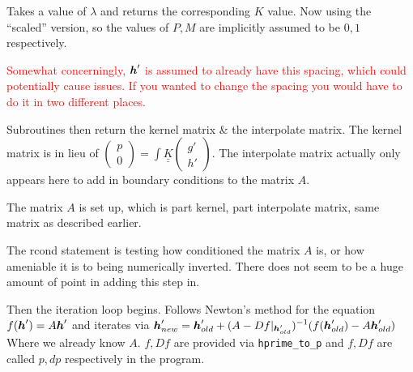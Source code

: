 Takes a value of $\lambda$ and returns the corresponding $K$ value.
Now using the ``scaled'' version, so the values of $P,M$ are implicitly
assumed to be $0,1$ respectively.

\textcolor{red}{Somewhat concerningly, $\boldsymbol{h}'$ is assumed to 
already have this spacing, which could potentially cause issues.
If you wanted to change the spacing you would have to do it in
two different places.}

Subroutines then return the kernel matrix \& the interpolate matrix.
The kernel matrix is in lieu of $\displaystyle \left( \begin{array}{c}
p \\ 0 \end{array} \right) = \int \underline{\underline{K}} \left(
\begin{array}{c} g' \\ h' \end{array} \right) $.
The interpolate matrix actually only appears here to add in boundary
conditions to the matrix $A$.

The matrix $A$ is set up, which is part kernel, part interpolate matrix,
same matrix as described earlier.

The rcond statement is testing how conditioned the matrix $A$ is, or how 
ameniable it is to being numerically inverted. There does not seem to be
a huge amount of point in adding this step in.

Then the iteration loop begins. Follows Newton's method for the equation
$f(\boldsymbol{h}') = A \boldsymbol{h}'$ and iterates via $\displaystyle \boldsymbol{h}'_{new} =
\boldsymbol{h}'_{old} + (A-Df|_{\boldsymbol{h}_{old}'})^{-1}(f(\boldsymbol{h}_{old}') - A\boldsymbol{h}_{old}')$
Where we already know $A$. $f, Df$ are provided via \texttt{hprime\_to\_p}
and $f, Df$ are called $p, dp$ respectively in the program.
